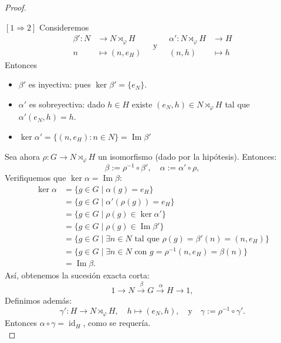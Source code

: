\begin{proof}
	\textcolor{white}{text} %
	
	\medskip
	\noindent
	$[1 \Rightarrow 2]$ Consideremos 
	$$\begin{array}{rl}
		\beta': N&\longrightarrow N\rtimes_{\varphi}H\\
		n&\longmapsto (n,e_H)
	\end{array}\quad\text{y}\quad\begin{array}{rl}
		\alpha': N\rtimes_{\varphi}H&\longrightarrow H\\
		(n,h)&\longmapsto h
	\end{array}$$
	Entonces
	\begin{itemize}
		\item $\beta'$ es inyectiva: pues $\ker \beta'=\{e_N\}$.
		\item $\alpha'$ es sobreyectiva: dado $h\in H$ existe $(e_N,h) \in N\rtimes_{\varphi}H$ tal que $\alpha'(e_N,h)=h$.
		\item $\ker \alpha'=\{(n,e_H):n\in N\}=\operatorname{Im}\beta'$
	\end{itemize}
	Sea ahora $\rho: G \to N \rtimes_\varphi H$ un isomorfismo (dado por la hipótesis). Entonces:
	\[
	\beta := \rho^{-1} \circ \beta', \quad \alpha := \alpha' \circ \rho,
	\]
	Verifiquemos que $\ker \alpha = \operatorname{Im} \beta$:
	\begin{align*}
		\ker \alpha &= \{ g \in G \mid \alpha(g) = e_H \} \\
		&= \{ g \in G \mid \alpha'(\rho(g)) = e_H \} \\
		&= \{ g \in G \mid \rho(g) \in \ker \alpha' \} \\
		&= \{ g \in G \mid \rho(g) \in \operatorname{Im} \beta' \} \\
		&= \{ g \in G \mid \exists n \in N \text{ tal que } \rho(g) = \beta'(n) = (n, e_H) \} \\
		&= \{ g \in G \mid \exists n \in N \text{ con } g = \rho^{-1}(n, e_H) = \beta(n) \} \\
		&= \operatorname{Im} \beta.
	\end{align*}
	Así, obtenemos la sucesión exacta corta:
	\[
	1 \to N \xrightarrow{\:\:\beta\:} G \xrightarrow{\:\:\alpha\:} H \to 1,
	\]
	Definimos además:
	\[
	\gamma': H \to N \rtimes_\varphi H,\quad h \mapsto (e_N, h), \quad \text{y} \quad \gamma := \rho^{-1} \circ \gamma'.
	\]
	Entonces $\alpha \circ \gamma = \operatorname{id}_H$, como se requería.\\
	

\end{proof}
